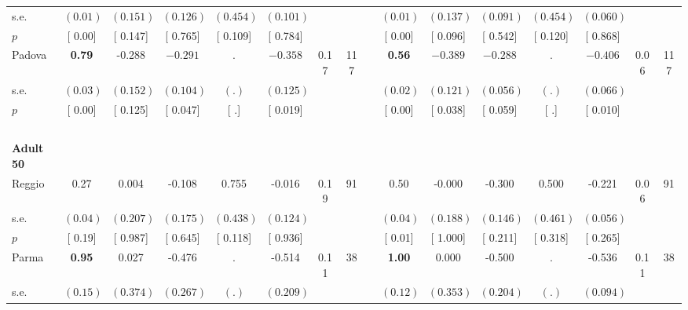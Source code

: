 \begin{longtable}{L{8em} c c c c c c c p{1em} c c c c c c c}
\quad \quad \quad \quad s.e.& $ (     0.01)$ & $ (    0.151)$ & $ (    0.126)$ & $ (    0.454)$ & $ (    0.101)$ & & & & $ (     0.01)$ & $ (    0.137)$ & $ (    0.091)$ & $ (    0.454)$ & $ (    0.060)$ & &  \\*
\quad \quad \quad \quad $ p$ & [     0.00] & [    0.147] & [    0.765] & [    0.109] & [    0.784] & & & & [     0.00] & [    0.096] & [    0.542] & [    0.120] & [    0.868] & &  \\[1em]
\quad \quad \quad Padova& \textbf{     0.79} &    -0.288 & $ \mathbf{   -0.291}$ &         . & $ \mathbf{   -0.358}$ &      0.17 &       117 & & \textbf{     0.56} & $ \mathbf{   -0.389}$ & $ \mathbf{   -0.288}$ &         . & $ \mathbf{   -0.406}$ &      0.06 &       117  \\*
\quad \quad \quad \quad s.e.& $ (     0.03)$ & $ (    0.152)$ & $ (    0.104)$ & $ (        .)$ & $ (    0.125)$ & & & & $ (     0.02)$ & $ (    0.121)$ & $ (    0.056)$ & $ (        .)$ & $ (    0.066)$ & &  \\*
\quad \quad \quad \quad $ p$ & [     0.00] & [    0.125] & [    0.047] & [        .] & [    0.019] & & & & [     0.00] & [    0.038] & [    0.059] & [        .] & [    0.010] & &  \\[1em]
~\\[1em]
\quad \quad \textbf{Adult 50} & & & & & & & & & & & & & & & \\* 
\quad \quad \quad Reggio& 0.27 &     0.004 &    -0.108 &     0.755 &    -0.016 &      0.19 &        91 & & 0.50 &    -0.000 &    -0.300 &     0.500 &    -0.221 &      0.06 &        91  \\*
\quad \quad \quad \quad s.e.& $ (     0.04)$ & $ (    0.207)$ & $ (    0.175)$ & $ (    0.438)$ & $ (    0.124)$ & & & & $ (     0.04)$ & $ (    0.188)$ & $ (    0.146)$ & $ (    0.461)$ & $ (    0.056)$ & &  \\*
\quad \quad \quad \quad $ p$ & [     0.19] & [    0.987] & [    0.645] & [    0.118] & [    0.936] & & & & [     0.01] & [    1.000] & [    0.211] & [    0.318] & [    0.265] & &  \\[1em]
\quad \quad \quad Parma& \textbf{     0.95} &     0.027 &    -0.476 &         . &    -0.514 &      0.11 &        38 & & \textbf{     1.00} &     0.000 &    -0.500 &         . &    -0.536 &      0.11 &        38  \\*
\quad \quad \quad \quad s.e.& $ (     0.15)$ & $ (    0.374)$ & $ (    0.267)$ & $ (        .)$ & $ (    0.209)$ & & & & $ (     0.12)$ & $ (    0.353)$ & $ (    0.204)$ & $ (        .)$ & $ (    0.094)$ & &  \\*

\end{longtable}
